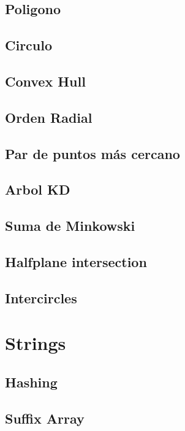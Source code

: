\documentclass[a4paper,10pt,landscape,twocolumn]{article}
\begin{document}
\subsection{Poligono}

\subsection{Circulo}

\subsection{Convex Hull}

\subsection{Orden Radial}

\subsection{Par de puntos más cercano}

\subsection{Arbol KD}

\subsection{Suma de Minkowski}

\subsection{Halfplane intersection}

\subsection{Intercircles}


\section{Strings} %
\subsection{Hashing}

\subsection{Suffix Array}

\end{document}
